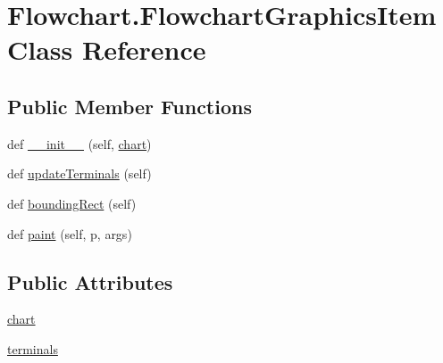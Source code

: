 \hypertarget{classFlowchart_1_1FlowchartGraphicsItem}{}\section{Flowchart.\+Flowchart\+Graphics\+Item Class Reference}
\label{classFlowchart_1_1FlowchartGraphicsItem}
\subsection*{Public Member Functions}
\begin{DoxyCompactItemize}
\item 
def \hyperlink{classFlowchart_1_1FlowchartGraphicsItem_a16a4f583fcbe809db1bfcf36b30cbb3c}{\+\_\+\+\_\+init\+\_\+\+\_\+} (self, \hyperlink{classFlowchart_1_1FlowchartGraphicsItem_a45b3c53ca87846d8371be9a2b4f105de}{chart})
\item 
def \hyperlink{classFlowchart_1_1FlowchartGraphicsItem_a04fff90776f467e80dc74cf01f7de075}{update\+Terminals} (self)
\item 
def \hyperlink{classFlowchart_1_1FlowchartGraphicsItem_a1ddef431c6038f1667559a14bfca806d}{bounding\+Rect} (self)
\item 
def \hyperlink{classFlowchart_1_1FlowchartGraphicsItem_acd7fbc7ecf3b1d2244a1cf0275d9872a}{paint} (self, p, args)
\end{DoxyCompactItemize}
\subsection*{Public Attributes}
\begin{DoxyCompactItemize}
\item 
\hyperlink{classFlowchart_1_1FlowchartGraphicsItem_a45b3c53ca87846d8371be9a2b4f105de}{chart}
\item 
\hyperlink{classFlowchart_1_1FlowchartGraphicsItem_a919ee98b54e9529135f69abc23d7ebe9}{terminals}
\end{DoxyCompactItemize}


